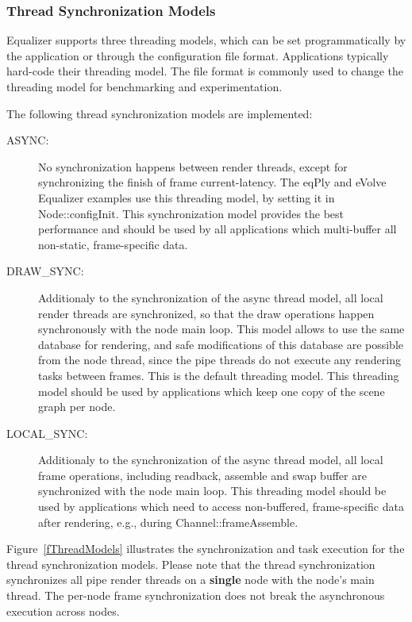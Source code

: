 \documentclass[10pt,a4]{scrartcl}
\newcommand{\fig}[1]{Figure~\ref{#1}}
\begin{document}
\subsubsection{\label{sThreadModel}Thread Synchronization Models}
Equalizer supports three threading models, which can be set
programmatically by the application or through the configuration file
format. Applications typically hard-code their threading model. The file
format is commonly used to change the threading model for benchmarking
and experimentation.

The following thread synchronization models are implemented:
\begin{description}
\item[ASYNC:] No synchronization happens between render threads, except
  for synchronizing the finish of frame \textsf{current-latency}. The
  \textsf{eqPly} and \textsf{eVolve} Equalizer examples use this
  threading model, by setting it in \textsf{Node::configInit}. This
  synchronization model provides the best performance and should be used
  by all applications which multi-buffer all non-static, frame-specific
  data.
\item[DRAW\_SYNC:] Additionaly to the synchronization of the async
  thread model, all local render threads are synchronized, so that the
  draw operations happen synchronously with the node main loop. This
  model allows to use the same database for rendering, and safe
  modifications of this database are possible from the node thread,
  since the pipe threads do not execute any rendering tasks between
  frames. This is the default threading model. This threading model
  should be used by applications which keep one copy of the scene graph
  per node.
\item[LOCAL\_SYNC:] Additionaly to the synchronization of the async
  thread model, all local frame operations, including readback, assemble
  and swap buffer are synchronized with the node main loop. This
  threading model should be used by applications which need to access
  non-buffered, frame-specific data after rendering, e.g., during
  \textsf{Channel::frameAssemble}.
\end{description}

\fig{fThreadModels} illustrates the synchronization and task execution
for the thread synchronization models. Please note that the thread
synchronization synchronizes all pipe render threads on a
\textbf{single} node with the node's main thread. The per-node frame
synchronization does not break the asynchronous execution across
nodes.
\end{document}
